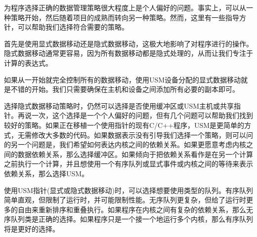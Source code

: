 为程序选择正确的数据管理策略很大程度上是个人偏好的问题。事实上，可以从一种策略开始，然后随着项目的成熟而转向另一种策略。然而，这里有一些指导方针，可以帮助我们选择符合需要的策略。\par

首先是使用显式数据移动还是隐式数据移动，这极大地影响了对程序进行的操作。隐式数据移动通常更容易，因为所有数据移动都是隐式处理的，从而让我们专注于计算的表达式。\par

如果从一开始就完全控制所有的数据移动，使用USM设备分配的显式数据移动就是不错的开始。我们只需要确保在主机和设备之间添加所有必要的副本即可。\par

选择隐式数据移动策略时，仍然可以选择是否使用缓冲区或USM主机或共享指针。再说一次，这个选择是一个个人偏好的问题，但有几个问题可以帮助我们找到较好的策略。如果正在移植一个使用指针的现有C/C++程序，USM是更简单的方式，无需修改大多数的代码。如果数据表示没有引导我们选择一个策略，则可以问的另一个问题是，我们希望如何表达内核之间的依赖关系。如果更愿意考虑内核之间的数据依赖关系，那么选择缓冲区。如果倾向于把依赖关系看作是在另一个计算之前执行一个计算，并且想使用一个有序队列或显式事件或内核之间的等待来表示依赖关系，那么选择USM。\par

使用USM指针(显式或隐式数据移动)时，可以选择想要使用类型的队列。有序队列简单直观，但限制了运行时，并可能限制性能。无序队列更复杂，但给了运行时更多的自由来重新排序和重叠执行。如果程序在内核之间有复杂的依赖关系，那么无序队列类是正确的选择。如果程序只是一个接一个地运行多个内核，那么有序队列将是更好的选择。\par






















